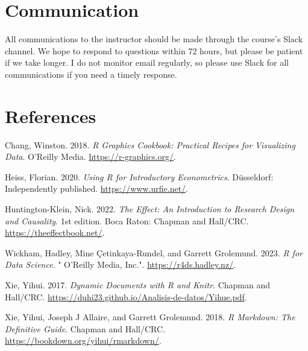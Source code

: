 \documentclass[
  letterpaper,
  DIV=11,
  numbers=noendperiod]{scrartcl}
\newlength{\cslhangindent}
\newenvironment{CSLReferences}[2] %
 {\begin{list}{}{%
  \setlength{\itemindent}{0pt}
  \setlength{\leftmargin}{0pt}
  \setlength{\parsep}{0pt}
  \ifodd #1
   \setlength{\leftmargin}{\cslhangindent}
   \setlength{\itemindent}{-1\cslhangindent}
  \fi
  \setlength{\itemsep}{#2\baselineskip}}}
 {\end{list}}
\begin{document}
\section{Communication}\label{communication}

All communications to the instructor should be made through the course's
Slack channel. We hope to respond to questions within 72 hours, but
please be patient if we take longer. I do not monitor email regularly,
so please use Slack for all communications if you need a timely
response.

\section*{References}\label{references}

\label{refs}
\begin{CSLReferences}{1}{0}
Chang, Winston. 2018. \emph{R Graphics Cookbook: Practical Recipes for
Visualizing Data}. O'Reilly Media. \url{https://r-graphics.org/}.

Heiss, Florian. 2020. \emph{Using {R} for {Introductory Econometrics}}.
Düsseldorf: Independently published. \url{https://www.urfie.net/}.

Huntington-Klein, Nick. 2022. \emph{The Effect: {An} Introduction to
Research Design and Causality}. 1st edition. Boca Raton: {Chapman and
Hall/CRC}. \url{https://theeffectbook.net/}.

Wickham, Hadley, Mine Çetinkaya-Rundel, and Garrett Grolemund. 2023.
\emph{R for Data Science}. " O'Reilly Media, Inc.".
\url{https://r4ds.hadley.nz/}.

Xie, Yihui. 2017. \emph{Dynamic Documents with {R} and Knitr}. {Chapman
and Hall/CRC}.
\url{https://duhi23.github.io/Analisis-de-datos/Yihue.pdf}.

Xie, Yihui, Joseph J Allaire, and Garrett Grolemund. 2018. \emph{R
Markdown: {The} Definitive Guide}. {Chapman and Hall/CRC}.
\url{https://bookdown.org/yihui/rmarkdown/}.

\end{CSLReferences}
\end{document}
